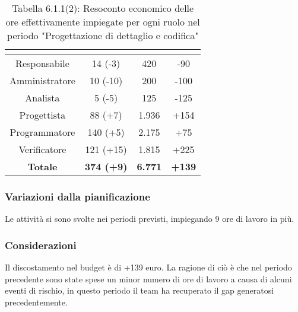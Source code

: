 \renewcommand{\arraystretch}{1.4}
\begin{table}[H]
\begin{center}
\begin{tabular}{|c|c|c|c|}
\hline
\rowcolor{title_row}
\textbf{\color{title_text}{Ruolo}}  & \textbf{\color{title_text}{Ore}} & \textbf{\color{title_text}{Costo in \euro}} & \textbf{\color{title_text}{Differenza al preventivo in \euro}} \\ \hline
Responsabile    & 14 (-3) & 420 & -90\\  \hline
Amministratore  & 10 (-10)& 200 & -100 \\ \hline
Analista        & 5 (-5) & 125 & -125 \\ \hline
Progettista     & 88 (+7) & 1.936 & +154\\ \hline
Programmatore   & 140 (+5) & 2.175 & +75\\ \hline
Verificatore    & 121 (+15) & 1.815& +225\\ \hline
\textbf{Totale} & \textbf{374 (+9)}    & \textbf{6.771} & \textbf{+139} \\ \hline
\end{tabular}
\caption{Tabella 6.1.1(2): Resoconto economico delle ore effettivamente impiegate per ogni ruolo nel periodo "Progettazione di dettaglio e codifica"\label{}}
\end{center}
\end{table}
\renewcommand{\arraystretch}{1}


\subsubsection{Variazioni dalla pianificazione}
Le attività si sono svolte nei periodi previsti, impiegando 9 ore di lavoro in più.

\subsubsection{Considerazioni}
Il discostamento nel budget è di +139 euro. La ragione di ciò è che nel periodo precedente sono state spese un minor numero di ore di lavoro a causa di alcuni eventi di rischio, in questo periodo il team ha recuperato il gap generatosi precedentemente. 

\pagebreak
